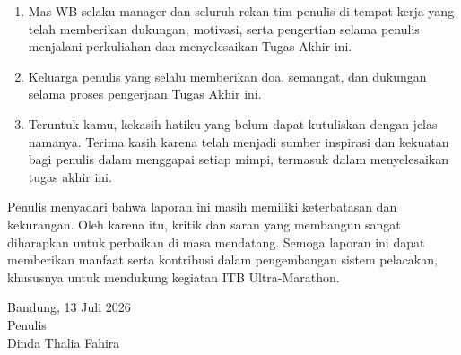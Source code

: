 \begin{enumerate}
    \item Mas WB selaku manager dan seluruh rekan tim penulis di tempat kerja yang telah memberikan dukungan, motivasi, serta pengertian selama penulis menjalani perkuliahan dan menyelesaikan Tugas Akhir ini.
 
    \item Keluarga penulis yang selalu memberikan doa, semangat, dan dukungan selama proses pengerjaan Tugas Akhir ini.

   \item Teruntuk kamu, kekasih hatiku yang belum dapat kutuliskan dengan jelas namanya. Terima kasih karena telah menjadi sumber inspirasi dan kekuatan bagi penulis dalam menggapai setiap mimpi, termasuk dalam menyelesaikan tugas akhir ini. 
\end{enumerate}

Penulis menyadari bahwa laporan ini masih memiliki keterbatasan dan kekurangan. Oleh karena itu, kritik dan saran yang membangun sangat diharapkan untuk perbaikan di masa mendatang. Semoga laporan ini dapat memberikan manfaat serta kontribusi dalam pengembangan sistem pelacakan, khususnya untuk mendukung kegiatan ITB Ultra-Marathon.
\begin{flushright}
    Bandung, 13 Juli 2026\\
    
    Penulis \\
    \vspace{3cm}
    Dinda Thalia Fahira \\
\end{flushright}


